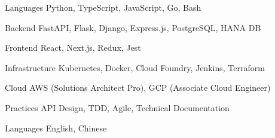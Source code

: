

\begin{cvskills}

  \cvskill
    {Languages} %
    {Python, TypeScript, JavaScript, Go, Bash} %

  \cvskill
    {Backend} %
    {FastAPI, Flask, Django, Express.js, PostgreSQL, HANA DB} %

  \cvskill
    {Frontend} %
    {React, Next.js, Redux, Jest} %

  \cvskill
    {Infrastructure} %
    {Kubernetes, Docker, Cloud Foundry, Jenkins, Terraform} %

  \cvskill
    {Cloud} %
    {AWS (Solutions Architect Pro), GCP (Associate Cloud Engineer)} %

  \cvskill
    {Practices} %
    {API Design, TDD, Agile, Technical Documentation} %

  \cvskill
    {Languages} %
    {English, Chinese} %


\end{cvskills}
